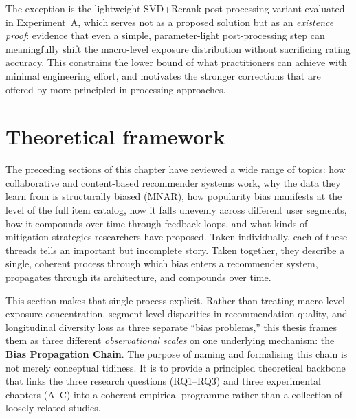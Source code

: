 \documentclass[11pt,a4paper]{report}
\begin{document}
The exception is the lightweight SVD+Rerank post-processing variant evaluated in Experiment~A, which serves not as a proposed solution but as an \emph{existence proof}: evidence that even a simple, parameter-light post-processing step can meaningfully shift the macro-level exposure distribution without sacrificing rating accuracy. This constrains the lower bound of what practitioners can achieve with minimal engineering effort, and motivates the stronger corrections that are offered by more principled in-processing approaches.

\section{Theoretical framework}
\label{sec:lit_theory}

The preceding sections of this chapter have reviewed a wide range of topics: how collaborative and content-based recommender systems work, why the data they learn from is structurally biased (MNAR), how popularity bias manifests at the level of the full item catalog, how it falls unevenly across different user segments, how it compounds over time through feedback loops, and what kinds of mitigation strategies researchers have proposed. Taken individually, each of these threads tells an important but incomplete story. Taken together, they describe a single, coherent process through which bias enters a recommender system, propagates through its architecture, and compounds over time.

This section makes that single process explicit. Rather than treating macro-level exposure concentration, segment-level disparities in recommendation quality, and longitudinal diversity loss as three separate ``bias problems,'' this thesis frames them as three different \emph{observational scales} on one underlying mechanism: the \textbf{Bias Propagation Chain}. The purpose of naming and formalising this chain is not merely conceptual tidiness. It is to provide a principled theoretical backbone that links the three research questions (RQ1--RQ3) and three experimental chapters (A--C) into a coherent empirical programme rather than a collection of loosely related studies.
\end{document}
